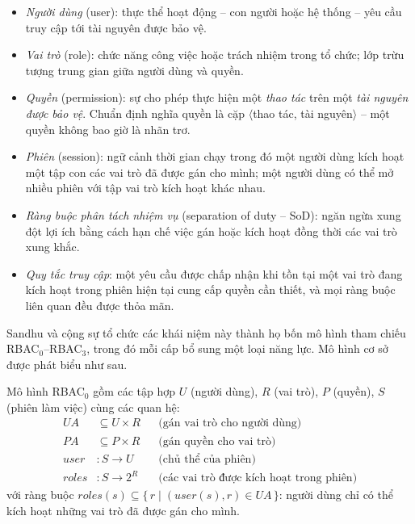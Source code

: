 \begin{itemize}[leftmargin=1.6em,itemsep=3pt]
  \item \emph{Người dùng} (user): thực thể hoạt động -- con người hoặc hệ thống -- yêu cầu truy cập tới tài nguyên được bảo vệ.
  \item \emph{Vai trò} (role): chức năng công việc hoặc trách nhiệm trong tổ chức; lớp trừu tượng trung gian giữa người dùng và quyền.
  \item \emph{Quyền} (permission): sự cho phép thực hiện một \emph{thao tác} trên một \emph{tài nguyên được bảo vệ}. Chuẩn định nghĩa quyền là cặp $\langle$thao tác, tài nguyên$\rangle$ -- một quyền không bao giờ là nhãn trơ.
  \item \emph{Phiên} (session): ngữ cảnh thời gian chạy trong đó một người dùng kích hoạt một tập con các vai trò đã được gán cho mình; một người dùng có thể mở nhiều phiên với tập vai trò kích hoạt khác nhau.
  \item \emph{Ràng buộc phân tách nhiệm vụ} (separation of duty -- SoD): ngăn ngừa xung đột lợi ích bằng cách hạn chế việc gán hoặc kích hoạt đồng thời các vai trò xung khắc.
  \item \emph{Quy tắc truy cập}: một yêu cầu được chấp nhận khi tồn tại một vai trò đang kích hoạt trong phiên hiện tại cung cấp quyền cần thiết, và mọi ràng buộc liên quan đều được thỏa mãn.
\end{itemize}

Sandhu và cộng sự \cite{sandhu1996} tổ chức các khái niệm này thành họ bốn mô hình tham chiếu RBAC$_0$--RBAC$_3$, trong đó mỗi cấp bổ sung một loại năng lực. Mô hình cơ sở được phát biểu như sau.

\begin{dinhnghia}[RBAC$_0$]
\label{dn:rbac0}
Mô hình RBAC$_0$ gồm các tập hợp $U$ (người dùng), $R$ (vai trò), $P$ (quyền), $S$ (phiên làm việc) cùng các quan hệ:
\begin{align*}
  UA &\subseteq U \times R & &\text{(gán vai trò cho người dùng)}\\
  PA &\subseteq P \times R & &\text{(gán quyền cho vai trò)}\\
  \mathit{user} &: S \to U & &\text{(chủ thể của phiên)}\\
  \mathit{roles} &: S \to 2^{R} & &\text{(các vai trò được kích hoạt trong phiên)}
\end{align*}
với ràng buộc $\mathit{roles}(s) \subseteq \{\, r \mid (\mathit{user}(s), r) \in UA \,\}$: người dùng chỉ có thể kích hoạt những vai trò đã được gán cho mình.
\end{dinhnghia}

